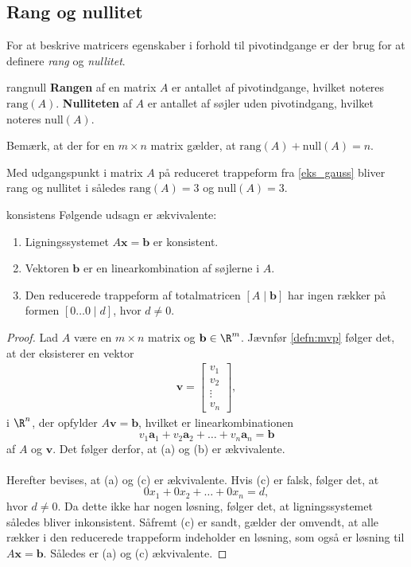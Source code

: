 \subsection{Rang og nullitet}
% 
For at beskrive matricers egenskaber i forhold til pivotindgange er der brug for at definere \textit{rang} og \textit{nullitet}.
%
\begin{defn}{}{rangnull}
\textbf{Rangen} af en matrix $A$ er antallet af pivotindgange, hvilket noteres $\text{rang}(A)$.
\textbf{Nulliteten} af $A$ er antallet af søjler uden pivotindgang, hvilket noteres $\text{null}(A)$.
\end{defn}
%
\noindent
Bemærk, at der for en $m \times n$ matrix gælder, at $\text{rang}(A)+\text{null}(A)=n$.\\
%
\begin{eks}
Med udgangspunkt i matrix $A$ på reduceret trappeform fra \ref{eks_gauss} bliver rang og nullitet i således $\text{rang}(A)=3$ og $\text{null}(A)=3$.
\end{eks}
%
\begin{thm}{}{konsistens}
%
Følgende udsagn er ækvivalente:
%
\begin{enumerate}[label=(\alph*)]
\item Ligningssystemet $A\mathbf{x}=\mathbf{b}$ er konsistent.
\item Vektoren $\mathbf{b}$ er en linearkombination af søjlerne i $A$.
\item Den reducerede trappeform af totalmatricen $[A \mid \mathbf{b}]$ har ingen rækker på formen $[ 0 \ldots 0 \mid d ]$, hvor $d \neq 0$.
\end{enumerate}
%
\end{thm}
%
\begin{proof}
%
Lad $A$ være en $m \times n$ matrix og $\mathbf{b} \in \R^m$. Jævnfør \ref{defn:mvp} følger det, at der eksisterer en vektor 
%
\begin{align*}    
       \mathbf{v} = \begin{bmatrix}
		v_{1} \\
        v_{2} \\
        \vdots \\
        v_{n} 
        \end{bmatrix},  
\end{align*}
%
i $\R^n$, der opfylder $A\mathbf{v}=\mathbf{b}$,
hvilket er linearkombinationen
%
$$v_1 \mathbf{a}_1+v_2 \mathbf{a}_2 + \ldots + v_n \mathbf{a}_n = \textbf{b}$$
%
af $A$ og $\textbf{v}$. 
Det følger derfor, at (a) og (b) er ækvivalente.\\\\
%
Herefter bevises, at (a) og (c) er ækvivalente. 
Hvis (c) er falsk, følger det, at
%
$$0 x_1+0 x_2 + \ldots + 0x_n =d,$$
%
hvor $d\neq0$. Da dette ikke har nogen løsning, følger det, at ligningssystemet således bliver inkonsistent. 
Såfremt (c) er sandt, gælder der omvendt, at alle rækker i den reducerede trappeform indeholder en løsning, som også er løsning til $A\mathbf{x}=\mathbf{b}$. 
Således er (a) og (c) ækvivalente.
%
\end{proof}
